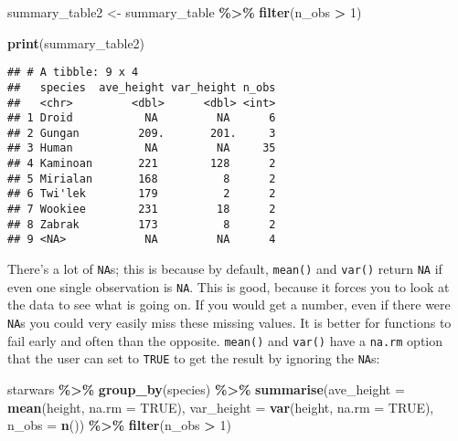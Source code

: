 \documentclass[
]{article}
\newenvironment{Shaded}{\begin{snugshade}}{\end{snugshade}}
\newcommand{\DataTypeTok}[1]{\textcolor[rgb]{0.13,0.29,0.53}{#1}}
\newcommand{\DecValTok}[1]{\textcolor[rgb]{0.00,0.00,0.81}{#1}}
\newcommand{\KeywordTok}[1]{\textcolor[rgb]{0.13,0.29,0.53}{\textbf{#1}}}
\newcommand{\NormalTok}[1]{#1}
\newcommand{\OperatorTok}[1]{\textcolor[rgb]{0.81,0.36,0.00}{\textbf{#1}}}
\newcommand{\OtherTok}[1]{\textcolor[rgb]{0.56,0.35,0.01}{#1}}
\newcommand{\StringTok}[1]{\textcolor[rgb]{0.31,0.60,0.02}{#1}}
\begin{document}
\begin{Shaded}
\begin{Highlighting}[]
\NormalTok{summary\_table2 \textless{}{-}}\StringTok{ }\NormalTok{summary\_table }\OperatorTok{\%\textgreater{}\%}
\StringTok{  }\KeywordTok{filter}\NormalTok{(n\_obs }\OperatorTok{\textgreater{}}\StringTok{ }\DecValTok{1}\NormalTok{)}

\KeywordTok{print}\NormalTok{(summary\_table2)}
\end{Highlighting}
\end{Shaded}

\begin{verbatim}
## # A tibble: 9 x 4
##   species  ave_height var_height n_obs
##   <chr>         <dbl>      <dbl> <int>
## 1 Droid           NA         NA      6
## 2 Gungan         209.       201.     3
## 3 Human           NA         NA     35
## 4 Kaminoan       221        128      2
## 5 Mirialan       168          8      2
## 6 Twi'lek        179          2      2
## 7 Wookiee        231         18      2
## 8 Zabrak         173          8      2
## 9 <NA>            NA         NA      4
\end{verbatim}

There's a lot of \texttt{NA}s; this is because by default, \texttt{mean()} and \texttt{var()} return \texttt{NA} if even one
single observation is \texttt{NA}. This is good, because it forces you to look at the data
to see what is going on. If you would get a number, even if there were \texttt{NA}s you could very easily
miss these missing values. It is better for functions to fail early and often than the opposite.
\texttt{mean()} and \texttt{var()} have a \texttt{na.rm} option that the user can set to \texttt{TRUE} to get the result by
ignoring the \texttt{NA}s:

\begin{Shaded}
\begin{Highlighting}[]
\NormalTok{starwars }\OperatorTok{\%\textgreater{}\%}
\StringTok{  }\KeywordTok{group\_by}\NormalTok{(species) }\OperatorTok{\%\textgreater{}\%}
\StringTok{  }\KeywordTok{summarise}\NormalTok{(}\DataTypeTok{ave\_height =} \KeywordTok{mean}\NormalTok{(height, }\DataTypeTok{na.rm =} \OtherTok{TRUE}\NormalTok{), }\DataTypeTok{var\_height =} \KeywordTok{var}\NormalTok{(height, }\DataTypeTok{na.rm =} \OtherTok{TRUE}\NormalTok{), }\DataTypeTok{n\_obs =} \KeywordTok{n}\NormalTok{()) }\OperatorTok{\%\textgreater{}\%}
\StringTok{  }\KeywordTok{filter}\NormalTok{(n\_obs }\OperatorTok{\textgreater{}}\StringTok{ }\DecValTok{1}\NormalTok{)}
\end{Highlighting}
\end{Shaded}
\end{document}
